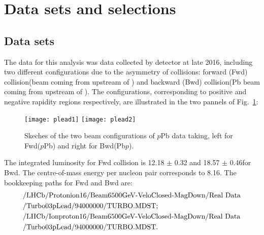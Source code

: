 \def\logipchisq{\ensuremath{\log_{10}\chi^2_{\text{IP}}~}}
\section{Data sets and selections}
\label{sec:data}
\subsection{Data sets}
The data for this analysis was \plead data collected by \lhcb detector at late 2016,
including two different configurations due to the asymmetry of collisions:
forward (Fwd) collision(\proton beam coming from upstream of \velo)
and backward (Bwd) collision(Pb beam coming from upstream of \velo).
The configurations, corresponding to positive and negative rapidity regions respectively,
are illustrated in the two pannels of Fig.~\ref{fig:FwdBwd}:
\begin{figure}[htbp]
    \texttt{[image: plead1]}
    \texttt{[image: plead2]}
    \caption{Skeches of the two beam configurations of $p$Pb data taking,
    left for Fwd($p$Pb) and right for Bwd(Pb$p$).}
    \label{fig:FwdBwd}
\end{figure}
The integrated luminosity for Fwd collision is 12.18 $\pm$ 0.32 \invnb and 18.57 $\pm$ 0.46\invnb for Bwd.
The centre-of-mass energy per nucleon pair \sqsnn corresponds to 8.16\tev.
The bookkeeping paths for Fwd and Bwd are:
\begin{align*}\tiny
    &\text{/LHCb/Protonion16/Beam6500GeV-VeloClosed-MagDown/Real Data}\\
    &\text{/Turbo03pLead/94000000/TURBO.MDST}; \\
    &\text{/LHCb/Ionproton16/Beam6500GeV-VeloClosed-MagDown/Real Data}\\
    &\text{/Turbo03pLead/94000000/TURBO.MDST}.
\end{align*}

